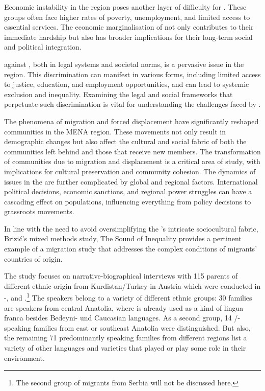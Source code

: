 \documentclass[output=paper,colorlinks,citecolor=brown]{langscibook}
\begin{document}
Economic instability in the region poses another layer of difficulty for . These groups often face higher rates of poverty, unemployment, and limited access to essential services. The economic marginalisation of  not only contributes to their immediate hardship but also has broader implications for their long-term social and political integration.

 against , both in legal systems and societal norms, is a pervasive issue in the region. This discrimination can manifest in various forms, including limited access to justice, education, and employment opportunities, and can lead to systemic exclusion and inequality. Examining the legal and social frameworks that perpetuate such discrimination is vital for understanding the challenges faced by .

The phenomena of migration and forced displacement have significantly reshaped  communities in the MENA region. These movements not only result in demographic changes but also affect the cultural and social fabric of both the communities left behind and those that receive new members. The transformation of  communities due to migration and displacement is a critical area of study, with implications for cultural preservation and community cohesion. The dynamics of  issues in the  are further complicated by global and regional factors. International political decisions, economic sanctions, and regional power struggles can have a cascading effect on  populations, influencing everything from policy decisions to grassroots movements.

In line with the need to avoid oversimplifying the 's intricate sociocultural fabric, Brizić's mixed methods study, The Sound of Inequality \citep[]{brizic2021,brizic_bulut_simsek2021} provides a pertinent example of a migration study that addresses the complex conditions of migrants' countries of origin. 

The study focuses on narrative-biographical interviews with 115 parents of different ethnic origin from Kurdistan/Turkey in Austria which were conducted in -,  and .\footnote{%
The second group of migrants from Serbia will not be discussed here.} The speakers belong to a variety of different ethnic groups: 30 families are  speakers from central Anatolia, where   is already used as a kind of lingua franca besides Bedeyni- und Caucasian languages. As a second group, 14 /-speaking families from east or southeast Anatolia were distinguished. But also, the remaining 71 predominantly  speaking families from different regions list a variety of other languages and varieties that played or play some role in their environment. 
\end{document}
